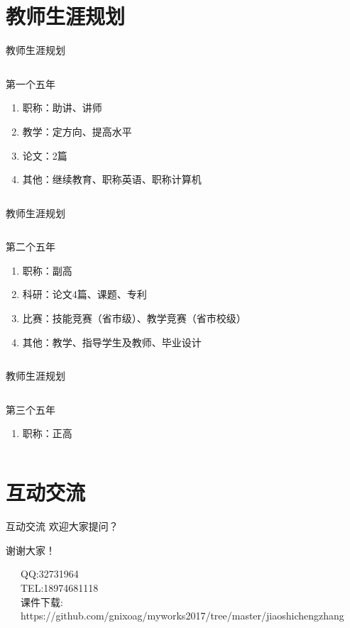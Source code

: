 \documentclass[14pt]{beamer}
\begin{document}
\section{教师生涯规划}

\begin{frame}{教师生涯规划}
\begin{columns}
	\begin{block}{\centering 第一个五年}
\begin{enumerate}[<+->]
	\item 职称：助讲、讲师
	\item 教学：定方向、提高水平
	\item 论文：2篇
	\item 其他：继续教育、职称英语、职称计算机
\end{enumerate}
	\end{block}
\end{columns}
\end{frame}

\begin{frame}{教师生涯规划}
\begin{columns}
	\begin{block}{\centering 第二个五年}
\begin{enumerate}[<+->]
	\item 职称：副高
	\item 科研：论文4篇、课题、专利
	\item 比赛：技能竞赛（省市级）、教学竞赛（省市校级）
	\item 其他：教学、指导学生及教师、毕业设计	
\end{enumerate}
	\end{block}
\end{columns}
\end{frame}

\begin{frame}{教师生涯规划}
\begin{columns}
	\begin{block}{\centering 第三个五年}
	\begin{enumerate}[<+->]
	\item 职称：正高
	\end{enumerate}
	\end{block}
\end{columns}
\end{frame}

\section{互动交流}
\begin{frame}{互动交流}
\centering \huge 欢迎大家提问？
\end{frame}

\begin{frame}[plain]
\vfill

\centering \huge 谢谢大家！

\vfill

\flushleft \footnotesize   
~~~QQ:32731964\\
~~~TEL:18974681118\\
~~~课件下载:\\
~~~https://github.com/gnixoag/myworks2017/tree/master/jiaoshichengzhang

\end{frame}
\end{document}

